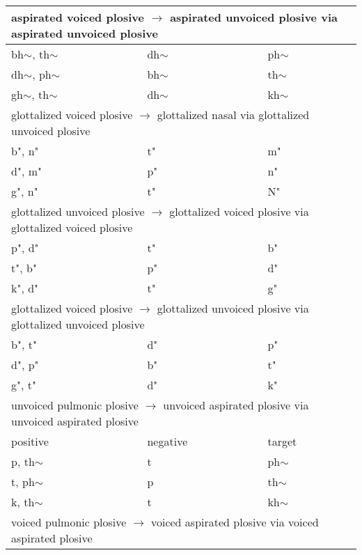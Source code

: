 \documentclass[6pt]{article}
\begin{document}
\begin{longtable}{ l | l | l }
 \hline \multicolumn{3}{l}{aspirated voiced plosive $\rightarrow$ aspirated unvoiced plosive via aspirated unvoiced plosive    }\\  \hline
bh$\sim$, th$\sim$ & dh$\sim$ & ph$\sim$ \\
dh$\sim$, ph$\sim$ & bh$\sim$ & th$\sim$ \\
gh$\sim$, th$\sim$ & dh$\sim$ & kh$\sim$ \\

 \hline \multicolumn{3}{l}{glottalized voiced plosive $\rightarrow$  glottalized nasal via glottalized unvoiced plosive }\\  \hline
b", n" & t" & m" \\
d", m" & p" & n" \\
g", n" & t" & N" \\

 \hline \multicolumn{3}{l}{glottalized unvoiced plosive $\rightarrow$ glottalized voiced plosive via glottalized voiced plosive   }\\  \hline
p", d" & t" & b" \\
t", b" & p" & d" \\
k", d" & t" & g" \\

 \hline \multicolumn{3}{l}{glottalized voiced plosive $\rightarrow$ glottalized unvoiced plosive via glottalized unvoiced plosive   }\\  \hline
b", t" & d" & p" \\
d", p" & b" & t" \\
g", t" & d" & k" \\

%
%
%
%
\hline\multicolumn{3}{l}{unvoiced pulmonic plosive  $\rightarrow$ unvoiced aspirated plosive via unvoiced aspirated plosive }\\  \hline
positive & negative & target \\ \hline

p, th$\sim$ & t & ph$\sim$ \\
t, ph$\sim$ & p & th$\sim$ \\
k, th$\sim$ & t & kh$\sim$ \\

\hline \multicolumn{3}{l}{voiced pulmonic plosive  $\rightarrow$ voiced aspirated plosive via voiced aspirated plosive  }\\  \hline


\end{longtable}
\end{document}
